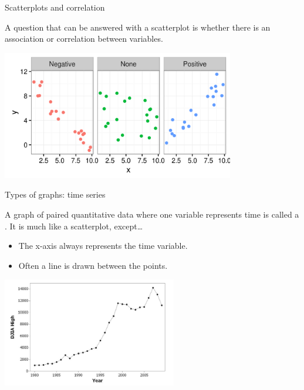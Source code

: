 \documentclass[xcolor=table, aspectratio=169, bigger, handout]{beamer}
\begin{document}
\begin{frame}{Scatterplots and correlation}
\begin{block}{}
\large
A question that can be answered with a scatterplot is whether there is an association or correlation between variables.  
\end{block}

\bigskip
{\centering
\includegraphics[width=4in]{../images/wk04_scatter_cor}
\par}
\end{frame}

\begin{frame}{Types of graphs: time series}
\begin{block}{}
A graph of paired quantitative data where one variable represents time is called a . It is much like a scatterplot, except\ldots
\begin{itemize}
\item The x-axis always represents the time variable.
\item Often a line is drawn between the points.
\end{itemize}
\end{block}
\bigskip
{\centering
\includegraphics[width=3in]{../images/wk04_timeseries}
\par}

\end{frame}
\end{document}
